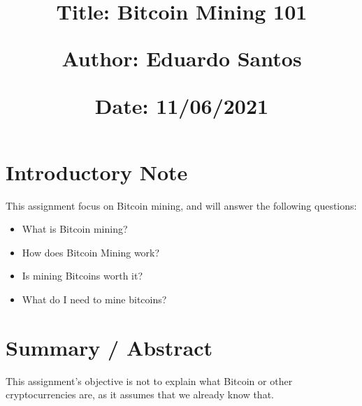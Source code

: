 \documentclass{article}
\newcommand\tab[1][1cm]{\hspace*{#1}}
\begin{document}
\title{\vspace{-0.9cm}
       \vspace{1cm}
       \normalsize
       \raggedright\textbf{Title: \hspace{1.5cm} Bitcoin Mining 101} \\ \vspace{0.4cm}
       \raggedright\textbf{Author: \hspace{1.1cm} Eduardo Santos} \\ \vspace{0.4cm}
       \raggedright\textbf{Date: \hspace{1.47cm} 11/06/2021} \\}
\author{}
\date{}

\maketitle
\thispagestyle{fancy}


\vspace{-1.4cm}

\tableofcontents


\fontsize{10pt}{13pt}
\selectfont
\lsstyle


\newpage

\section{Introductory Note}

\tab This assignment focus on Bitcoin mining, and will answer the following questions:

\begin{itemize}
    \item What is Bitcoin mining?
    \item How does Bitcoin Mining work?
    \item Is mining Bitcoins worth it?
    \item What do I need to mine bitcoins?
\end{itemize}
\tab 

\section{Summary / Abstract}

\tab This assignment's objective is not to explain what Bitcoin or other cryptocurrencies are, as it assumes that we already know that. 
\end{document}
